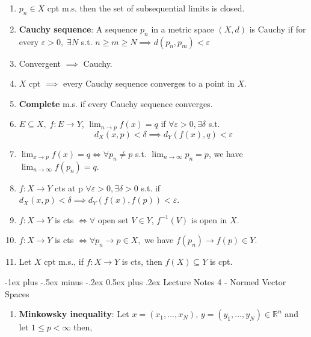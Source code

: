 \documentclass[10pt,landscape]{article}
\makeatletter
\renewcommand{\section}{\@startsection{section}{1}{0mm}%
                                {-1ex plus -.5ex minus -.2ex}%
                                {0.5ex plus .2ex}%
                                {\normalfont\large\bfseries}}
\makeatother
\begin{document}
\begin{multicols}{3}
\begin{enumerate}
	\item $p_n \in X$ cpt m.s. then the set of subsequential limits is closed.
	
	\item \textbf{Cauchy sequence}: A sequence $p_n$ in a metric space $(X, d)$ is Cauchy if for every $\varepsilon >0, \; \exists N$ s.t. $n\geq m\geq N \implies d(p_n, p_m) < \varepsilon$
	
	\item Convergent $\implies$ Cauchy.
	\item $X$ cpt $\implies$ every Cauchy sequence converges to a point in $X$.
	
	\item \textbf{Complete} m.s. if every Cauchy sequence converges.
	
	\item $E\subseteq X, \; f: E\rightarrow Y$, $\lim_{n\rightarrow p} f(x) = q$ if $\forall \varepsilon>0, \exists \delta$ s.t. 
	$$d_X(x, p) < \delta \implies d_Y(f(x), q ) < \varepsilon$$
	
	\item $\lim_{x\rightarrow p} f(x) = q \iff \forall p_n \neq p$ s.t. $\lim_{n\rightarrow \infty} p_n = p$, we have $\lim_{n\rightarrow \infty} f(p_n) = q$.
	
	\item $f: X\rightarrow Y$ cts at p $\forall \varepsilon> 0, \exists \delta >0$ s.t. if $ d_X(x, p) < \delta \implies d_Y(f(x), f(p)) < \varepsilon$.
	
	\item $f: X\rightarrow Y$ is cts $\iff \forall$ open set $V \in Y$, $f^{-1}(V)$ is open in $X$.
	
	\item $f: X \rightarrow Y$ is cts $\iff \forall p_n \rightarrow p \in X, $ we have $f(p_n) \rightarrow f(p) \in Y$. 
	
	\item Let $X$ cpt m.s., if $f: X \rightarrow Y$ is cts, then $f(X) \subseteq Y$ is cpt.
\end{enumerate}

\section{Lecture Notes 4 - Normed Vector Spaces}
\begin{enumerate}
	\item \textbf{Minkowsky inequality}: Let $x = (x_1, ..., x_N)$, $ y = (y_1, ..., y_N) \in \mathbb{R}^n$ and let $1 \leq p < \infty$ then, 


\end{enumerate}
\end{multicols}
\end{document}

